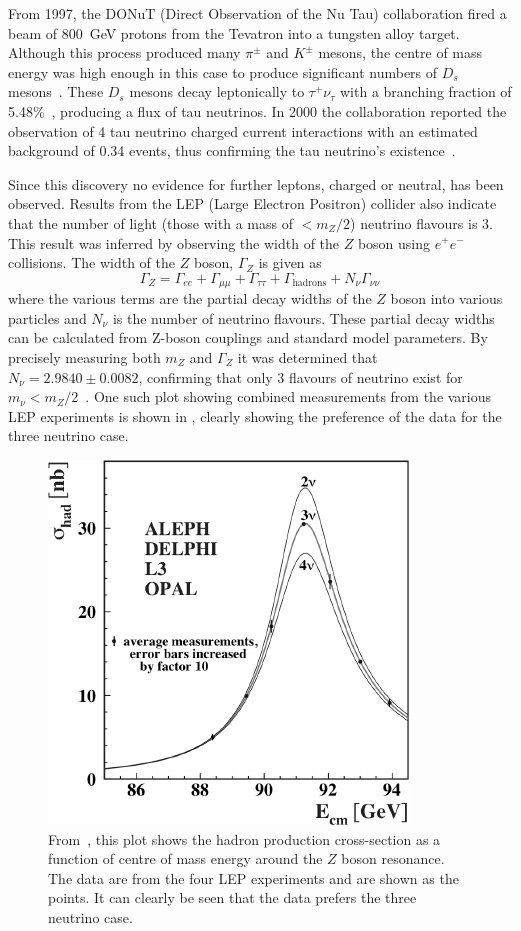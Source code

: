 From 1997, the DONuT (Direct Observation of the Nu Tau) collaboration fired a beam of 800~GeV protons from the Tevatron into a tungsten alloy target.
Although this process produced many $\pi^{\pm}$ and $K^{\pm}$ mesons, the centre of mass energy was high enough in this case to produce significant numbers of $D_{s}$ mesons~\cite{donutFinal}.
These $D_{s}$ mesons decay leptonically to $\tau^{+}\nu_{\tau}$ with a branching fraction of 5.48\%~\cite{pdg2020}, producing a flux of tau neutrinos.
In 2000 the collaboration reported the observation of 4 tau neutrino charged current interactions with an estimated background of 0.34 events, thus confirming the tau neutrino's existence~\cite{tauNeutrino}.  

Since this discovery no evidence for further leptons, charged or neutral, has been observed.
Results from the LEP (Large Electron Positron) collider also indicate that the number of light (those with a mass of $<m_{Z}/2$) neutrino flavours is 3.
This result was inferred by observing the width of the $Z$ boson using $e^{+}e^{-}$ collisions.
The width of the $Z$ boson, $\Gamma_{Z}$ is given as
\begin{equation}
  \Gamma_{Z} = \Gamma_{ee} + \Gamma_{\mu\mu} + \Gamma_{\tau\tau} + \Gamma_{\text{hadrons}} + N_{\nu}\Gamma_{\nu\nu}
\end{equation}
where the various terms are the partial decay widths of the $Z$ boson into various particles and $N_{\nu}$ is the number of neutrino flavours.
These partial decay widths can be calculated from Z-boson couplings and standard model parameters.
By precisely measuring both $m_{Z}$ and $\Gamma_{Z}$ it was determined that $N_{\nu} = 2.9840 \pm 0.0082$, confirming that only 3 flavours of neutrino exist for $m_{\nu} < m_{Z}/2$~\cite{zBosonWidth}.
One such plot showing combined measurements from the various LEP experiments is shown in , clearly showing the preference of the data for the three neutrino case.

\begin{figure}[h]
  \centering
  \includegraphics[width=.5\linewidth]{files/figures/theory/zBosonWidth}
  \caption[Hadron production cross-section around $Z$ boson resonance.]{From~\cite{zBosonWidth}, this plot shows the hadron production cross-section as a function of centre of mass energy around the $Z$ boson resonance. The data are from the four LEP experiments and are shown as the points. It can clearly be seen that the data prefers the three neutrino case.}
  \label{fig:zBosonWidth}
\end{figure}

